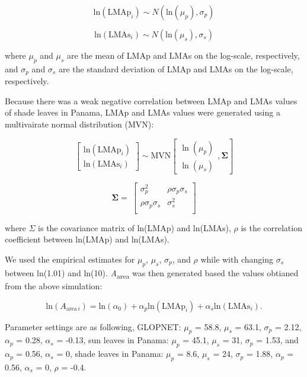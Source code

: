 \documentclass[
  12pt,
  letterpaper,
  DIV=11,
  numbers=noendperiod]{scrartcl}
\begin{document}
\[
\mathrm{ln}(\mathrm{LMAp}_{i}) \sim N(\mathrm{ln}(\mu_p), \sigma_p)
\]

\[
\mathrm{ln}(\mathrm{LMAs}_{i}) \sim N(\mathrm{ln}(\mu_s), \sigma_s)
\]

where \(\mu_p\) and \(\mu_s\) are the mean of LMAp and LMAs on the
log-scale, respectively, and \(\sigma_p\) and \(\sigma_s\) are the
standard deviation of LMAp and LMAs on the log-scale, respectively.

Because there was a weak negative correlation between LMAp and LMAs
values of shade leaves in Panama, LMAp and LMAs values were generated
using a multivairate normal distribution (MVN):

\[
\begin{bmatrix}
\mathrm{ln}(\mathrm{LMAp}_{i})\\
\mathrm{ln}(\mathrm{LMAs}_{i})
\end{bmatrix}
\sim \mathrm{MVN}
\left[
\begin{matrix}
\ln(\mu_{p})\\
\ln(\mu_{s})
\end{matrix}
,\mathbf{\Sigma}
\right]
\]

\[
\mathbf{\Sigma} = \
\begin{bmatrix}
\sigma_p^2 & \rho \sigma_p \sigma_s \\
\rho \sigma_p \sigma_s & \sigma_s^2 \\
\end{bmatrix}
\]

where \(\Sigma\) is the covariance matrix of ln(LMAp) and ln(LMAs),
\(\rho\) is the correlation coefficient between ln(LMAp) and ln(LMAs).

We used the empirical estimates for \(\mu_p\), \(\mu_s\), \(\sigma_p\),
and \(\rho\) while with changing \(\sigma_s\) between ln(1.01) and
ln(10). \emph{A}\textsubscript{area} was then generated based the values
obtianed from the above simulation:

\[
\mathrm{ln}(A_{\mathrm{area} \, i}) = \mathrm{ln}(\alpha_0) + \alpha_p\mathrm{ln}(\mathrm{LMAp}_{i}) + \alpha_s\mathrm{ln}(\mathrm{LMAs}_{i}).
\]

Parameter settings are as following, GLOPNET: \(\mu_p\) = 58.8,
\(\mu_s\) = 63.1, \(\sigma_p\) = 2.12, \(\alpha_p\) = 0.28, \(\alpha_s\)
= -0.13, sun leaves in Panama: \(\mu_p\) = 45.1, \(\mu_s\) = 31,
\(\sigma_p\) = 1.53, and \(\alpha_p\) = 0.56, \(\alpha_s\) = 0, shade
leaves in Panama: \(\mu_p\) = 8.6, \(\mu_s\) = 24, \(\sigma_p\) = 1.88,
\(\alpha_p\) = 0.56, \(\alpha_s\) = 0, \(\rho\) = -0.4.
\end{document}
